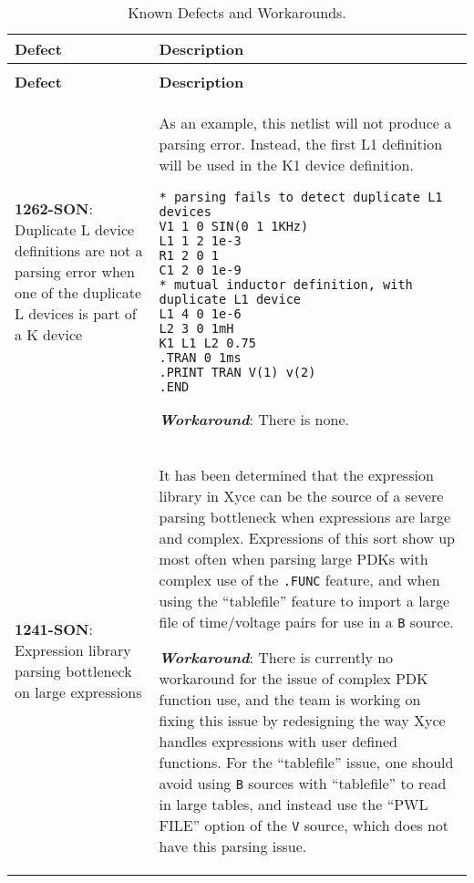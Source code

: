 {
\small

\begin{longtable}[h] {>{\raggedright\small}m{2in}|>{\raggedright\let\\\tabularnewline\small}m{3.5in}}
  \caption{Known Defects and Workarounds.} \\ \hline
  \rowcolor{XyceDarkBlue} \color{white}\textbf{Defect} & \color{white}\textbf{Description} \\ \hline \endfirsthead
  \caption[]{Known Defects and Workarounds.} \\ \hline
  \rowcolor{XyceDarkBlue} \color{white}\textbf{Defect} & \color{white}\textbf{Description}
  \\ \hline \endhead

%
%
\textbf{1262-SON}: Duplicate L device definitions are not a parsing error
when one of the duplicate L devices is part of a K device &
As an example, this netlist will not produce a parsing error.  Instead,
the first L1 definition will be used in the K1 device definition.
\begin{verbatim}
* parsing fails to detect duplicate L1 devices
V1 1 0 SIN(0 1 1KHz)
L1 1 2 1e-3
R1 2 0 1
C1 2 0 1e-9
* mutual inductor definition, with duplicate L1 device
L1 4 0 1e-6
L2 3 0 1mH
K1 L1 L2 0.75
.TRAN 0 1ms
.PRINT TRAN V(1) v(2)
.END
\end{verbatim}

\textbf{\textit{Workaround}}:
There is none.
\\ \hline

\textbf{1241-SON}: Expression library parsing bottleneck on large expressions &
It has been determined that the expression library in Xyce can be the
source of a severe parsing bottleneck when expressions are large and
complex.  Expressions of this sort show up most often when parsing
large PDKs with complex use of the \texttt{.FUNC} feature, and when
using the ``tablefile'' feature to import a large file of time/voltage
pairs for use in a \texttt{B} source.

\textbf{\textit{Workaround}}:
There is currently no workaround for the issue of complex PDK function
use, and the team is working on fixing this issue by redesigning the
way Xyce handles expressions with user defined functions.  For the
``tablefile'' issue, one should avoid using \texttt{B} sources with
``tablefile'' to read in large tables, and instead use the ``PWL
FILE'' option of the \texttt{V} source, which does not have this
parsing issue.
\\ \hline


\end{longtable}}
